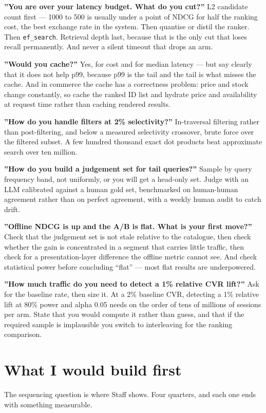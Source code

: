 \documentclass[10pt,twoside]{book}
\newcommand{\cchapter}[1]{\chapter{#1}}
\newcommand{\csection}[1]{\par\vspace{13pt}\noindent{\sffamily\large\bfseries\color{ink}\raggedright #1\par}\vspace{4pt}}
\begin{document}
\csection{On serving}
\textbf{''You are over your latency budget. What do you cut?''} L2 candidate count first --- 1000 to 500 is usually under a point of NDCG for half the ranking cost, the best exchange rate in the system. Then quantise or distil the ranker. Then \texttt{ef\_search}. Retrieval depth last, because that is the only cut that loses recall permanently. And never a silent timeout that drops an arm.\par
\textbf{''Would you cache?''} Yes, for cost and for median latency --- but say clearly that it does not help p99, because p99 is the tail and the tail is what misses the cache. And in commerce the cache has a correctness problem: price and stock change constantly, so cache the ranked ID list and hydrate price and availability at request time rather than caching rendered results.\par
\textbf{''How do you handle filters at 2\% selectivity?''} In-traversal filtering rather than post-filtering, and below a measured selectivity crossover, brute force over the filtered subset. A few hundred thousand exact dot products beat approximate search over ten million.\par
\csection{On evaluation}
\textbf{''How do you build a judgement set for tail queries?''} Sample by query frequency band, not uniformly, or you will get a head-only set. Judge with an LLM calibrated against a human gold set, benchmarked on human-human agreement rather than on perfect agreement, with a weekly human audit to catch drift.\par
\textbf{''Offline NDCG is up and the A/B is flat. What is your first move?''} Check that the judgement set is not stale relative to the catalogue, then check whether the gain is concentrated in a segment that carries little traffic, then check for a presentation-layer difference the offline metric cannot see. And check statistical power before concluding ``flat'' --- most flat results are underpowered.\par
\textbf{''How much traffic do you need to detect a 1\% relative CVR lift?''} Ask for the baseline rate, then size it. At a 2\% baseline CVR, detecting a 1\% relative lift at 80\% power and alpha 0.05 needs on the order of tens of millions of sessions per arm. State that you would compute it rather than guess, and that if the required sample is implausible you switch to interleaving for the ranking comparison.\par
\cchapter{What I would build first}
The sequencing question is where Staff shows. Four quarters, and each one ends with something measurable.\par
\end{document}
